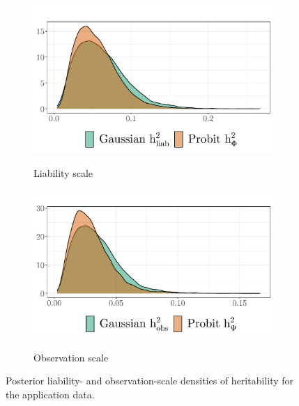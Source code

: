 \begin{figure}
    \centering
    \begin{subfigure}{0.49\textwidth}
        \centering
        \caption{Liability scale}
        \includegraphics{figures/heritability_application_liabscale.pdf}
        \label{fig:posterior application heritability:liability}
    \end{subfigure}
    \begin{subfigure}{0.49\textwidth}
        \centering
        \caption{Observation scale}
        \includegraphics{figures/heritability_application_obsscale.pdf}
        \label{fig:posterior application heritability:observation}
    \end{subfigure}
    \caption[Heritability density for application data]{Posterior liability- and observation-scale densities of heritability for the application data.}
    \label{fig:posterior application heritability}
\end{figure}


